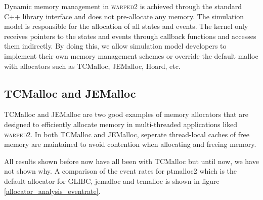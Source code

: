 \documentclass[11pt]{book}
\begin{document}
Dynamic memory management in \textsc{warped2} is achieved through the standard C++ library
interface and does not pre-allocate any memory.  The simulation model is responsible for the
allocation of all states and events.  The kernel only receives pointers to the states and events
through callback functions and accesses them indirectly.  By doing this, we allow simulation model
developers to implement their own memory management schemes or override the default malloc with
allocators such as TCMalloc, JEMalloc, Hoard, etc.

\subsection{TCMalloc and JEMalloc}

TCMalloc and JEMalloc are two good examples of memory allocators that are designed to efficiently
allocate memory in multi-threaded applications liked \textsc{warped2}.  In both TCMalloc and
JEMalloc, seperate thread-local caches of free memory are maintained to avoid contention when
allocating and freeing memory.

All results shown before now have all been with TCMalloc but until now, we have not shown why.
A comparison of the event rates for ptmalloc2 which is the default allocator for GLIBC, jemalloc
and tcmalloc is shown in figure \ref{allocator_analysis_eventrate}.
\end{document}
